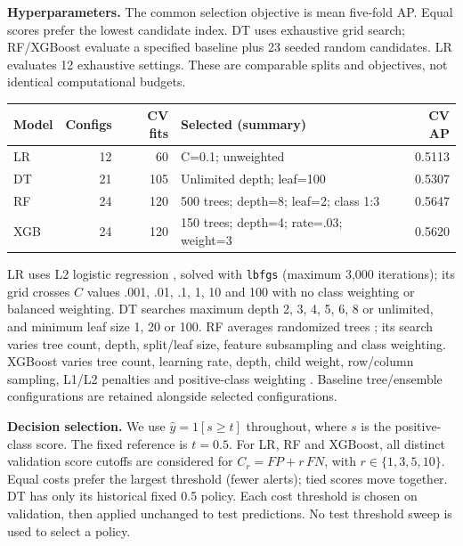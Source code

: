 \documentclass{article}
\begin{document}
\textbf{Hyperparameters.} The common selection objective is mean five-fold AP. Equal scores prefer the lowest candidate index. DT uses exhaustive grid search; RF/XGBoost evaluate a specified baseline plus 23 seeded random candidates. LR evaluates 12 exhaustive settings. These are comparable splits and objectives, not identical computational budgets.
\begin{center}
\begin{minipage}{\linewidth}
\centering
\begin{tabular}{@{}lrrp{47mm}r@{}}\toprule
Model & Configs & CV fits & Selected (summary) & CV AP\\\midrule
LR & 12 & 60 & C=0.1; unweighted & 0.5113\\
DT & 21 & 105 & Unlimited depth; leaf=100 & 0.5307\\
RF & 24 & 120 & 500 trees; depth=8; leaf=2; class 1:3 & 0.5647\\
XGB & 24 & 120 & 150 trees; depth=4; rate=.03; weight=3 & 0.5620\\
\bottomrule\end{tabular}
\end{minipage}
\end{center}

LR uses L2 logistic regression \citep{esl}, solved with \texttt{lbfgs} (maximum 3,000 iterations); its grid crosses $C$ values .001, .01, .1, 1, 10 and 100 with no class weighting or balanced weighting. DT searches maximum depth 2, 3, 4, 5, 6, 8 or unlimited, and minimum leaf size 1, 20 or 100. RF averages randomized trees \citep{rf}; its search varies tree count, depth, split/leaf size, feature subsampling and class weighting. XGBoost varies tree count, learning rate, depth, child weight, row/column sampling, L1/L2 penalties and positive-class weighting \citep{xgboost}. Baseline tree/ensemble configurations are retained alongside selected configurations.

\textbf{Decision selection.} We use $\hat y=1[s\geq t]$ throughout, where $s$ is the positive-class score. The fixed reference is $t=0.5$. For LR, RF and XGBoost, all distinct validation score cutoffs are considered for $C_r=FP+r\,FN$, with $r\in\{1,3,5,10\}$. Equal costs prefer the largest threshold (fewer alerts); tied scores move together. DT has only its historical fixed 0.5 policy. Each cost threshold is chosen on validation, then applied unchanged to test predictions. No test threshold sweep is used to select a policy.
\end{document}

